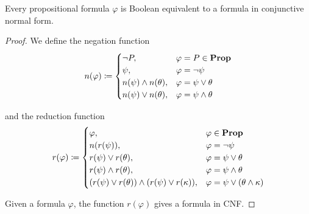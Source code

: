 \begin{proposition}\label{thm:conjunctive_normal_form_reduction}
  Every propositional formula $\varphi$ is Boolean equivalent to a formula in conjunctive normal form.
\end{proposition}
\begin{proof}
  We define the negation function
  \begin{align*}
    n(\varphi) \coloneqq \begin{cases}
      \neg P,                                                   &\varphi = P \in \operatorname{\mathbf{Prop}} \\
      \psi,                                                     &\varphi = \neg \psi \\
      n(\psi) \land n(\theta),                                  &\varphi = \psi \lor \theta \\
      n(\psi) \lor n(\theta),                                   &\varphi = \psi \land \theta \\
    \end{cases}
  \end{align*}

  and the reduction function
  \begin{align*}
    r(\varphi) \coloneqq \begin{cases}
      \varphi,                                                  &\varphi \in \operatorname{\mathbf{Prop}} \\
      n(r(\psi)),                                               &\varphi = \neg \psi \\
      r(\psi) \lor r(\theta),                                   &\varphi = \psi \lor \theta \\
      r(\psi) \land r(\theta),                                  &\varphi = \psi \land \theta \\
      (r(\psi) \lor r(\theta)) \land (r(\psi) \lor r(\kappa)),  &\varphi = \psi \lor (\theta \land \kappa) \\
    \end{cases}
  \end{align*}

  Given a formula $\varphi$, the function $r(\varphi)$ gives a formula in CNF.
\end{proof}


